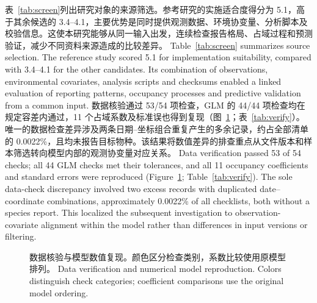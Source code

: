 \ifzh
表~\ref{tab:screen}列出研究对象的来源筛选。参考研究的实施适合度得分为 5.1，高于其余候选的 3.4--4.1，主要优势是同时提供观测数据、环境协变量、分析脚本及校验信息。这使本研究能够从同一输入出发，连续检查报告格局、占域过程和预测验证，减少不同资料来源造成的比较差异。
\else
Table~\ref{tab:screen} summarizes source selection. The reference study scored 5.1 for implementation suitability, compared with 3.4--4.1 for the other candidates. Its combination of observations, environmental covariates, analysis scripts and checksums enabled a linked evaluation of reporting patterns, occupancy processes and predictive validation from a common input.
\fi
{}
\ifzh
数据核验通过 53/54 项检查，GLM 的 44/44 项检查均在规定容差内通过，11 个占域系数及标准误也得到复现（图~\ref{fig:verify}；表~\ref{tab:verify}）。唯一的数据检查差异涉及两条日期--坐标组合重复产生的多余记录，约占全部清单的 0.0022\%，且均未报告目标物种。该结果将数值差异的排查重点从文件版本和样本筛选转向模型内部的观测协变量对应关系。
\else
Data verification passed 53 of 54 checks; all 44 GLM checks met their tolerances, and all 11 occupancy coefficients and standard errors were reproduced (Figure~\ref{fig:verify}; Table~\ref{tab:verify}). The sole data-check discrepancy involved two excess records with duplicated date--coordinate combinations, approximately 0.0022\% of all checklists, both without a species report. This localized the subsequent investigation to observation-covariate alignment within the model rather than differences in input versions or filtering.
\fi
\begin{figure}[htbp]\centering{}
\caption{\ifzh
数据核验与模型数值复现。颜色区分检查类别，系数比较使用原模型排列。
\else
Data verification and numerical model reproduction. Colors distinguish check categories; coefficient comparisons use the original model ordering.
\fi}\label{fig:verify}\end{figure}
\FloatBarrier
{\footnotesize\renewcommand{\arraystretch}{0.96}}
\FloatBarrier
